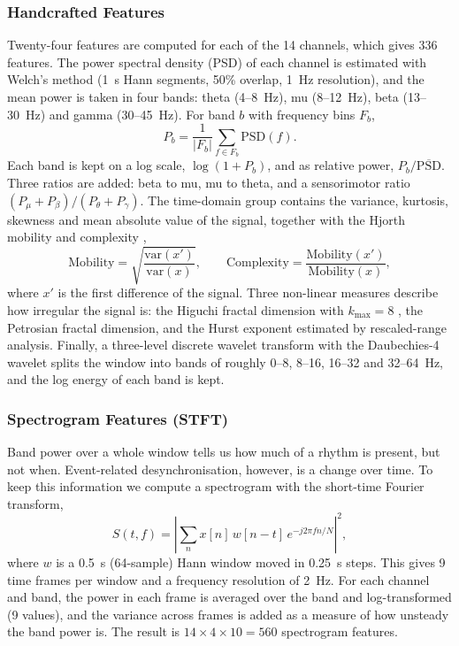 \documentclass[pdflatex,sn-mathphys-num]{sn-jnl}%
\theoremstyle{thmstyleone}%
\theoremstyle{thmstyletwo}%
\theoremstyle{thmstylethree}%
\begin{document}
\subsubsection{Handcrafted Features}\label{subsec:handcrafted}

Twenty-four features are computed for each of the 14 channels, which gives 336 features. The power spectral density (PSD) of each channel is estimated with Welch's method (1~s Hann segments, 50\% overlap, 1~Hz resolution), and the mean power is taken in four bands: theta (4--8~Hz), mu (8--12~Hz), beta (13--30~Hz) and gamma (30--45~Hz). For band $b$ with frequency bins $F_b$,
\begin{equation}
P_b = \frac{1}{|F_b|} \sum_{f \in F_b} \mathrm{PSD}(f).
\end{equation}
Each band is kept on a log scale, $\log(1 + P_b)$, and as relative power, $P_b / \overline{\mathrm{PSD}}$. Three ratios are added: beta to mu, mu to theta, and a sensorimotor ratio $(P_\mu + P_\beta)/(P_\theta + P_\gamma)$. The time-domain group contains the variance, kurtosis, skewness and mean absolute value of the signal, together with the Hjorth mobility and complexity \citep{Hjorth1970},
\begin{equation}
\mathrm{Mobility} = \sqrt{\frac{\mathrm{var}(x')}{\mathrm{var}(x)}}, \qquad
\mathrm{Complexity} = \frac{\mathrm{Mobility}(x')}{\mathrm{Mobility}(x)} ,
\end{equation}
where $x'$ is the first difference of the signal. Three non-linear measures describe how irregular the signal is: the Higuchi fractal dimension with $k_{\max} = 8$ \citep{Higuchi1988}, the Petrosian fractal dimension, and the Hurst exponent estimated by rescaled-range analysis. Finally, a three-level discrete wavelet transform with the Daubechies-4 wavelet splits the window into bands of roughly 0--8, 8--16, 16--32 and 32--64~Hz, and the log energy of each band is kept.

\subsubsection{Spectrogram Features (STFT)}\label{subsec:stft}

Band power over a whole window tells us how much of a rhythm is present, but not when. Event-related desynchronisation, however, is a change over time. To keep this information we compute a spectrogram with the short-time Fourier transform,
\begin{equation}
S(t, f) = \left| \sum_{n} x[n]\, w[n - t]\, e^{-j 2\pi f n / N} \right|^2 ,
\end{equation}
where $w$ is a 0.5~s (64-sample) Hann window moved in 0.25~s steps. This gives 9 time frames per window and a frequency resolution of 2~Hz. For each channel and band, the power in each frame is averaged over the band and log-transformed (9 values), and the variance across frames is added as a measure of how unsteady the band power is. The result is $14 \times 4 \times 10 = 560$ spectrogram features.
\end{document}
